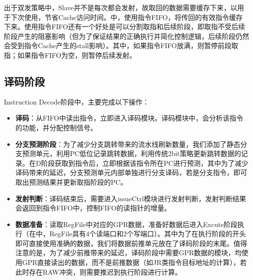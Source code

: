 出于双发策略中，Slave并不是每次都会发射，故取回的数据需要缓存下来，以用于下次使用，节省Cache访问时间。\cpuname 中，使用指令FIFO，将传回的有效指令缓存下来。使用指令FIFO还有一个好处是可以分割取指和后续阶段，即取指不受后续阶段产生的阻塞影响（但为了保证结果的正确执行并简化控制逻辑，后续阶段仍然会受到指令Cache产生的stall影响）。其中，如果指令FIFO放满，则暂停前段取指；如果指令FIFO为空，则暂停后续发射。

\subsection{译码阶段}
Instruction Decode阶段中，主要完成以下操作：
\begin{itemize}
    \item \textbf{译码}：从FIFO中读出指令，立即进入译码模块。译码模块中，会分析该指令的功能，并分配控制信号。
    \item \textbf{分支预测阶段}：为了减少分支跳转带来的流水线刷新数量，我们添加了静态分支预测单元，利用PC低位记录跳转数据，利用传统2bit策略更新跳转数据的记录。在D阶段获取到指令后，立即根据该指令所在PC进行预测，其中为了减少译码带来的延迟，分支预测单元内部单独进行分支译码，若是分支指令，即可取出预测结果并更新取指阶段的PC。
    \item \textbf{发射判断}：译码结束后，需要进入issueCtrl模块进行发射判断，发射判断结果会返回到指令FIFO中，控制FIFO的读指针的增量。
    \item \textbf{数据准备}：读取RegFile中对应的GPR数据，准备好数据后进入Excute阶段执行（在\cpuname 中，RegFile具有4个读端口和2个写端口）。其中为了在执行阶段的开头即可直接使用准确的数据，我们将数据前推单元放在了译码阶段的末尾。值得注意的是，为了减少前推带来的延迟，译码阶段中需要GPR数据的模块，均使用GPR直接读出的数据，而不是前推数据（如JR类指令目标地址的计算），若此时存在RAW冲突，则需要推迟到执行阶段进行计算。
\end{itemize}

